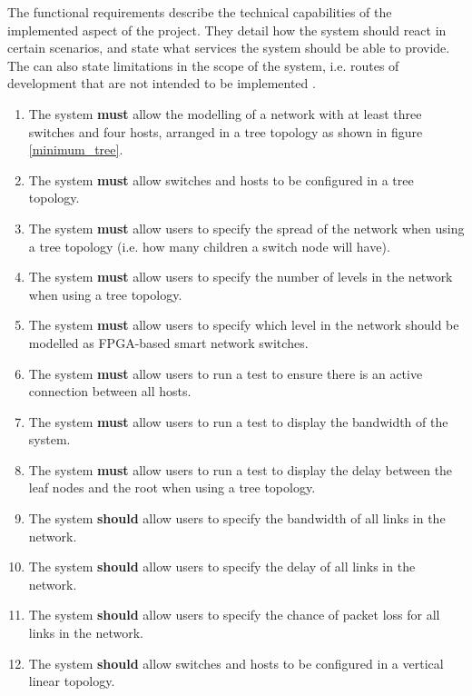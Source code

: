 
The functional requirements describe the technical capabilities of the implemented aspect of the project.
They detail how the system should react in certain scenarios, and state what services the system should be able to provide.
The can also state limitations in the scope of the system, i.e. routes of development that are not intended to be implemented \cite{software_engineering_req_analysis}.

\begin{enumerate}[label=\textbf{F\arabic*:}]
  \item The system \textbf{must} allow the modelling of a network with at least three switches and four hosts, arranged in a tree topology as shown in figure \ref{minimum_tree}.
  \item The system \textbf{must} allow switches and hosts to be configured in a tree topology.
  \item The system \textbf{must} allow users to specify the spread of the network when using a tree topology (i.e. how many children a switch node will have).
  \item The system \textbf{must} allow users to specify the number of levels in the network when using a tree topology.
  \item The system \textbf{must} allow users to specify which level in the network should be modelled as FPGA-based smart network switches.
  \item The system \textbf{must} allow users to run a test to ensure there is an active connection between all hosts.
  \item The system \textbf{must} allow users to run a test to display the bandwidth of the system.
  \item The system \textbf{must} allow users to run a test to display the delay between the leaf nodes and the root when using a tree topology.
  \item The system \textbf{should} allow users to specify the bandwidth of all links in the network.
  \item The system \textbf{should} allow users to specify the delay of all links in the network.
  \item The system \textbf{should} allow users to specify the chance of packet loss for all links in the network.
  \item The system \textbf{should} allow switches and hosts to be configured in a vertical linear topology.

\end{enumerate}
